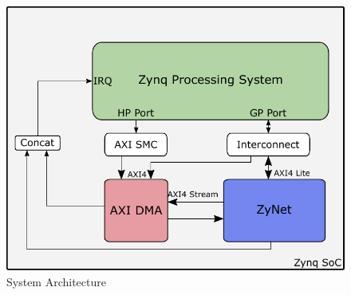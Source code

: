 \begin{figure}[!t]
\centering
   \includegraphics[width=0.8\columnwidth]{Figures/arch.pdf}
   \caption{System Architecture}
   \label{fig:sysarch}
\end{figure}